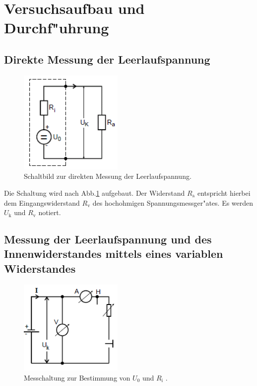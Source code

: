 \section{Versuchsaufbau und Durchf"uhrung} %
\label{sec:durchfuehrung}

\subsection{Direkte Messung der Leerlaufspannung} %
\label{sub:direkte_messung_der_leerlaufspannung}

\begin{figure}
	\centering
	\includegraphics[width = 5cm]{img/Monozelle.PNG}
	\caption{Schaltbild zur direkten Messung der Leerlaufspannung. \cite{anleitung}}
	\label{aufgabea}
\end{figure}

Die Schaltung wird nach Abb.\ref{aufgabea} aufgebaut. Der Widerstand $R_\mathrm{a}$ entspricht hierbei dem Eingangswiderstand $R_\mathrm{v}$ des hochohmigen Spannungsmessger"ates.
Es werden $U_\mathrm{k}$ und $R_\mathrm{v}$ notiert.

\newpage

\subsection{Messung der Leerlaufspannung und des Innenwiderstandes mittels eines variablen Widerstandes} %
\label{sub:messung_der_leerlaufspannung_mittels_eines_variablen_widerstandes_}

\begin{figure}
	\centering
	\includegraphics[width = 5cm]{img/b.PNG}
	\caption{Messchaltung zur Bestimmung von $U_\mathrm{0}$ und $R_\mathrm{i}$ \cite{anleitung}.}
	\label{aufgabeb}
\end{figure}

